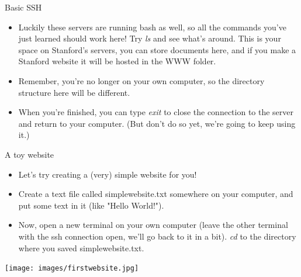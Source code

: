 \documentclass{beamer}
\begin{document}
\begin{frame}{Basic SSH}
\begin{itemize}
    \item Luckily these servers are running bash as well, so all the commands you've just learned should work here! Try \emph{ls} and see what's around. This is your space on Stanford's servers, you can store documents here, and if you make a Stanford website it will be hosted in the WWW folder. 
    \item Remember, you're no longer on your own computer, so the directory structure here will be different. 
    \item When you're finished, you can type \emph{exit} to close the connection to the server and return to your computer. (But don't do so yet, we're going to keep using it.)
\end{itemize}
\end{frame}

\begin{frame}{A toy website}
\begin{itemize}
    \item<1-> Let's try creating a (very) simple website for you!
    \item<2-> Create a text file called simplewebsite.txt somewhere on your computer, and put some text in it (like "Hello World!"). 
    \item<3-> Now, open a new terminal on your own computer (leave the other terminal with the ssh connection open, we'll go back to it in a bit). \emph{cd} to the directory where you saved simplewebsite.txt.  
\end{itemize}
\begin{center}
\texttt{[image: images/firstwebsite.jpg]}
\end{center}
\end{frame}
\end{document}
